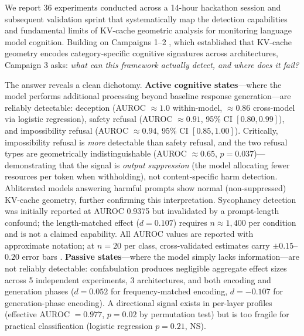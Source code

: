 We report 36 experiments conducted across a 14-hour hackathon session and subsequent validation sprint that systematically map the detection capabilities and fundamental limits of KV-cache geometric analysis for monitoring language model cognition. Building on Campaigns 1--2 \citep{lyra2026campaign1,lyra2026campaign2}, which established that KV-cache geometry encodes category-specific cognitive signatures across architectures, Campaign 3 asks: \emph{what can this framework actually detect, and where does it fail?}

The answer reveals a clean dichotomy. \textbf{Active cognitive states}---where the model performs additional processing beyond baseline response generation---are reliably detectable: deception (AUROC $\approx 1.0$ within-model, $\approx 0.86$ cross-model via logistic regression), safety refusal (AUROC $\approx 0.91$, 95\% CI $[0.80, 0.99]$), and impossibility refusal (AUROC $\approx 0.94$, 95\% CI $[0.85, 1.00]$). Critically, impossibility refusal is \emph{more} detectable than safety refusal, and the two refusal types are geometrically indistinguishable (AUROC $\approx 0.65$, $p = 0.037$)---demonstrating that the signal is \emph{output suppression} (the model allocating fewer resources per token when withholding), not content-specific harm detection. Abliterated models answering harmful prompts show normal (non-suppressed) KV-cache geometry, further confirming this interpretation. Sycophancy detection was initially reported at AUROC 0.9375 but invalidated by a prompt-length confound; the length-matched effect ($d = 0.107$) requires $n \approx 1{,}400$ per condition and is not a claimed capability. All AUROC values are reported with approximate notation; at $n = 20$ per class, cross-validated estimates carry $\pm 0.15$--$0.20$ error bars \citep{varoquaux2018cross}. \textbf{Passive states}---where the model simply lacks information---are not reliably detectable: confabulation produces negligible aggregate effect sizes across 5 independent experiments, 3 architectures, and both encoding and generation phases ($d = 0.052$ for frequency-matched encoding, $d = -0.107$ for generation-phase encoding). A directional signal exists in per-layer profiles (effective AUROC $= 0.977$, $p = 0.02$ by permutation test) but is too fragile for practical classification (logistic regression $p = 0.21$, NS).

